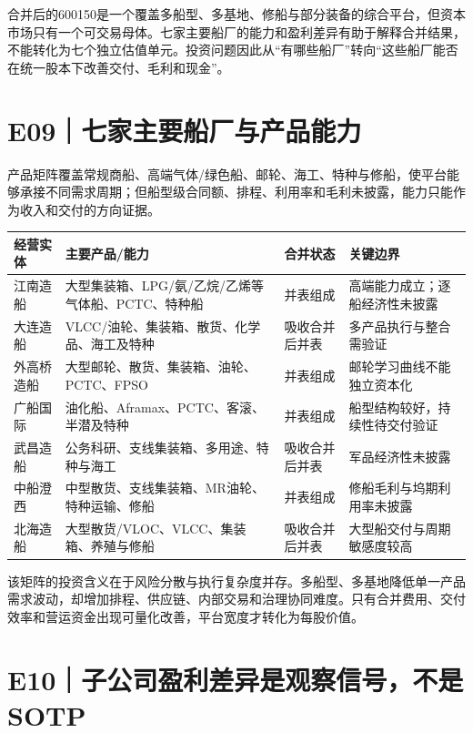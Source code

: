 合并后的600150是一个覆盖多船型、多基地、修船与部分装备的综合平台，但资本市场只有一个可交易母体。七家主要船厂的能力和盈利差异有助于解释合并结果，不能转化为七个独立估值单元。投资问题因此从“有哪些船厂”转向“这些船厂能否在统一股本下改善交付、毛利和现金”。

\section{E09｜七家主要船厂与产品能力}

产品矩阵覆盖常规商船、高端气体/绿色船、邮轮、海工、特种与修船，使平台能够承接不同需求周期；但船型级合同额、排程、利用率和毛利未披露，能力只能作为收入和交付的方向证据。

\begin{exhibitbox}[主要船厂能力地图]
\small
\begin{tabularx}{\exhibitboxwidth}{L{2.3cm}L{5.0cm}L{3.0cm}X}
\toprule
\textbf{经营实体} & \textbf{主要产品/能力} & \textbf{合并状态} & \textbf{关键边界} \\
\midrule
江南造船 & 大型集装箱、LPG/氨/乙烷/乙烯等气体船、PCTC、特种船 & 并表组成 & 高端能力成立；逐船经济性未披露 \\
大连造船 & VLCC/油轮、集装箱、散货、化学品、海工及特种 & 吸收合并后并表 & 多产品执行与整合需验证 \\
外高桥造船 & 大型邮轮、散货、集装箱、油轮、PCTC、FPSO & 并表组成 & 邮轮学习曲线不能独立资本化 \\
广船国际 & 油化船、Aframax、PCTC、客滚、半潜及特种 & 并表组成 & 船型结构较好，持续性待交付验证 \\
武昌造船 & 公务科研、支线集装箱、多用途、特种与海工 & 吸收合并后并表 & 军品经济性未披露 \\
中船澄西 & 中型散货、支线集装箱、MR油轮、特种运输、修船 & 并表组成 & 修船毛利与坞期利用率未披露 \\
北海造船 & 大型散货/VLOC、VLCC、集装箱、养殖与修船 & 吸收合并后并表 & 大型船交付与周期敏感度较高 \\
\bottomrule
\end{tabularx}
\end{exhibitbox}

该矩阵的投资含义在于风险分散与执行复杂度并存。多船型、多基地降低单一产品需求波动，却增加排程、供应链、内部交易和治理协同难度。只有合并费用、交付效率和营运资金出现可量化改善，平台宽度才转化为每股价值。

\section{E10｜子公司盈利差异是观察信号，不是SOTP}

